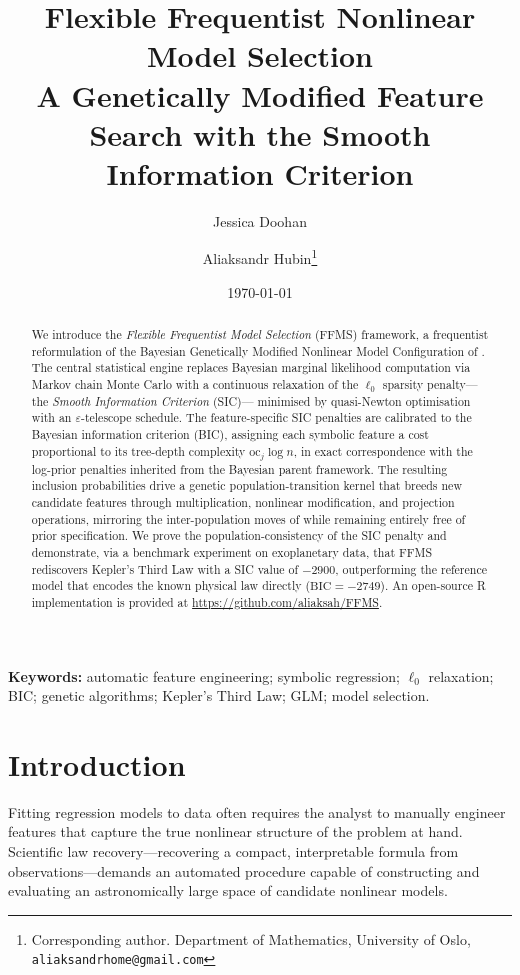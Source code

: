 \documentclass[12pt,a4paper]{article}
\title{%
  \textbf{Flexible Frequentist Nonlinear Model Selection}\\[0.5em]
  \large A Genetically Modified Feature Search with the Smooth Information Criterion
}
\author{
  Jessica Doohan
  \and
  Aliaksandr Hubin\thanks{Corresponding author.
    Department of Mathematics, University of Oslo,
    \texttt{aliaksandrhome@gmail.com}}
}
\date{\today}
\newcommand{\oc}{\mathrm{oc}}
\newcommand{\BIC}{\mathrm{BIC}}
\begin{document}
\maketitle

\begin{abstract}
We introduce the \emph{Flexible Frequentist Model Selection} (FFMS) framework,
a frequentist reformulation of the Bayesian Genetically Modified
Nonlinear Model Configuration of \citet{Hubin2021JAIR}.
The central statistical engine replaces Bayesian marginal likelihood
computation via Markov chain Monte Carlo with a continuous relaxation of the
$\ell_0$ sparsity penalty---the \emph{Smooth Information Criterion} (SIC)---
minimised by quasi-Newton optimisation with an $\varepsilon$-telescope schedule.
The feature-specific SIC penalties are calibrated to the Bayesian information
criterion (BIC), assigning each symbolic feature a cost proportional to its
tree-depth complexity $\oc_j\log n$, in exact correspondence with the log-prior
penalties inherited from the Bayesian parent framework.
The resulting inclusion probabilities drive a genetic population-transition
kernel that breeds new candidate features through multiplication, nonlinear
modification, and projection operations, mirroring the inter-population moves of
\citet{Hubin2021JAIR} while remaining entirely free of prior specification.
We prove the population-consistency of the SIC penalty and demonstrate, via a
benchmark experiment on exoplanetary data, that FFMS rediscovers Kepler's Third
Law with a SIC value of $-2900$, outperforming the reference model that encodes
the known physical law directly ($\BIC=-2749$).
An open-source R implementation is provided at
\url{https://github.com/aliaksah/FFMS}.
\end{abstract}

\medskip
\noindent\textbf{Keywords:}
automatic feature engineering; symbolic regression; $\ell_0$ relaxation; BIC;
genetic algorithms; Kepler's Third Law; GLM; model selection.

\newpage
\tableofcontents
\newpage

\section{Introduction}
\label{sec:intro}

Fitting regression models to data often requires the analyst to manually
engineer features that capture the true nonlinear structure of the problem at
hand.  Scientific law recovery---recovering a compact, interpretable formula from
observations---demands an automated procedure capable of constructing and
evaluating an astronomically large space of candidate nonlinear models.
\end{document}
